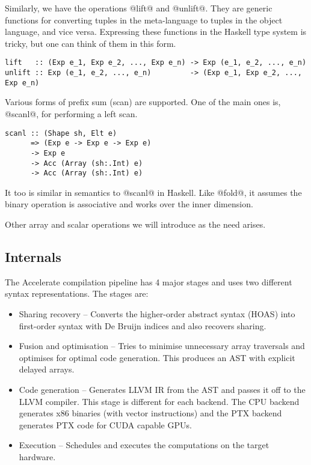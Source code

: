 Similarly, we have the operations @lift@ and @unlift@. They are generic functions for converting tuples in the meta-language to tuples in the object language, and vice versa. Expressing these functions in the Haskell type system is tricky, but one can think of them in this form.
%
\begin{lstlisting}[style=ndp]
lift   :: (Exp e_1, Exp e_2, ..., Exp e_n) -> Exp (e_1, e_2, ..., e_n)
unlift :: Exp (e_1, e_2, ..., e_n)         -> (Exp e_1, Exp e_2, ..., Exp e_n)
\end{lstlisting}
%

Various forms of prefix sum (scan) are supported. One of the main ones is, @scanl@, for performing a left scan.
%
\begin{lstlisting}
scanl :: (Shape sh, Elt e)
      => (Exp e -> Exp e -> Exp e)
      -> Exp e
      -> Acc (Array (sh:.Int) e)
      -> Acc (Array (sh:.Int) e)
\end{lstlisting}
%
It too is similar in semantics to @scanl@ in Haskell. Like @fold@, it assumes the binary operation is associative and works over the inner dimension.

Other array and scalar operations we will introduce as the need arises.


\subsection{Internals}
\label{sec:acc-internals}

The Accelerate compilation pipeline has 4 major stages and uses two different syntax representations. The stages are:
%
\begin{itemize}
%
\item Sharing recovery -- Converts the higher-order abstract syntax (HOAS) into first-order syntax with De Bruijn indices and also recovers sharing.
%
%
\item Fusion and optimisation -- Tries to minimise unnecessary array traversals and optimises for optimal code generation. This produces an AST with explicit delayed arrays.
%
\item Code generation -- Generates LLVM IR from the AST and passes it off to the LLVM compiler. This stage is different for each backend. The CPU backend generates x86 binaries (with vector instructions) and the PTX backend generates PTX code for CUDA capable GPUs.
%
\item Execution -- Schedules and executes the computations on the target hardware.
\end{itemize}
%

